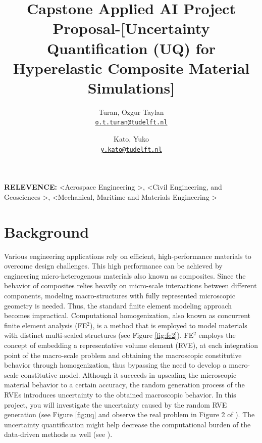 \documentclass[11pt, english] {article}
\title{Capstone Applied AI Project Proposal-[Uncertainty Quantification (UQ) for Hyperelastic Composite Material Simulations]\vspace{-2ex}}
\author{
  Turan, Ozgur Taylan\\
  \href{mailto:o.t.turan@tudelft.nl}{\texttt{o.t.turan@tudelft.nl}}
  \and
  Kato, Yuko\\
  \href{mailto:y.kato@tudelft.nl}{\texttt{y.kato@tudelft.nl}}
\vspace{-2ex}}
\begin{document}
  \maketitle
\textbf{RELEVENCE:} \textless Aerospace Engineering \textgreater, \textless Civil Engineering, and Geosciences \textgreater, \textless Mechanical, Maritime and Materials Engineering \textgreater

\section{Background}
Various engineering applications rely on efficient, high-performance materials to overcome design challenges. This high performance can be achieved by engineering micro-heterogenous materials also known as composites. Since the behavior of composites relies heavily on micro-scale interactions between different components, modeling macro-structures with fully represented microscopic geometry is needed. Thus, the standard finite element modeling approach becomes impractical. Computational homogenization, also known as concurrent finite element analysis (FE$^2$), is a method that is employed to model materials with distinct multi-scaled structures (see Figure \ref{fig:fe2}). FE$^2$ employs the concept of embedding a representative volume element (RVE), at each integration point of the macro-scale problem and obtaining the macroscopic constitutive behavior through homogenization, thus bypassing the need to develop a macro-scale constitutive model. Although it succeeds in upscaling the microscopic material behavior to a certain accuracy, the random generation process of the RVEs introduces uncertainty to the obtained macroscopic behavior. In this project, you will investigate the uncertainty caused by the random RVE generation (see Figure \ref{fig:uq} and observe the real problem in Figure 2 of \cite{vandermeer2016}). The uncertainty quantification might help decrease the computational burden of the data-driven methods as well (see \cite{bessa2017}). 
\end{document}
